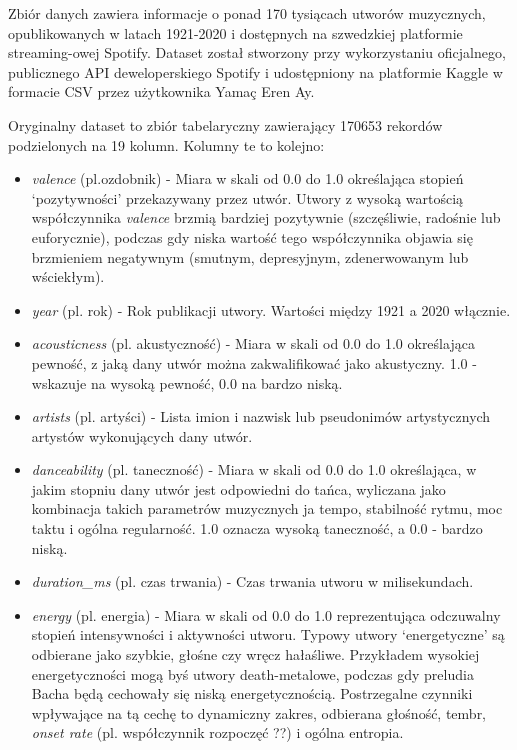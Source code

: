 \documentclass[a4paper,11pt]{article}
\begin{document}
    Zbiór danych zawiera informacje o ponad 170 tysiącach utworów muzycznych, opublikowanych w latach 1921-2020 i dostępnych na szwedzkiej platformie streaming-owej Spotify. Dataset został stworzony przy wykorzystaniu oficjalnego, publicznego API deweloperskiego Spotify i udostępniony na platformie Kaggle w formacie CSV przez użytkownika Yamaç Eren Ay\cite{SpotifyKaggleDataset2020}.

    \bigskip

    Oryginalny dataset to zbiór tabelaryczny zawierający 170653 rekordów podzielonych na 19 kolumn. Kolumny te to kolejno:
    \begin{itemize}
        \item \textit{valence} (pl.ozdobnik) - Miara w skali od 0.0 do 1.0 określająca stopień `pozytywności' przekazywany przez utwór. Utwory z wysoką wartością współczynnika \textit{valence} brzmią bardziej pozytywnie (szczęśliwie, radośnie lub euforycznie), podczas gdy niska wartość tego współczynnika objawia się brzmieniem negatywnym (smutnym, depresyjnym, zdenerwowanym lub wściekłym).
        \item \textit{year} (pl. rok) - Rok publikacji utwory. Wartości między 1921 a 2020 włącznie.
        \item \textit{acousticness} (pl. akustyczność) - Miara w skali od 0.0 do 1.0 określająca pewność, z jaką dany utwór można zakwalifikować jako akustyczny. 1.0 - wskazuje na wysoką pewność, 0.0 na bardzo niską.
        \item \textit{artists} (pl. artyści) - Lista imion i nazwisk lub pseudonimów artystycznych artystów wykonujących dany utwór.
        \item \textit{danceability} (pl. taneczność) - Miara w skali od 0.0 do 1.0 określająca, w jakim stopniu dany utwór jest odpowiedni do tańca, wyliczana jako kombinacja takich parametrów muzycznych ja tempo, stabilność rytmu, moc taktu i ogólna regularność. 1.0 oznacza wysoką taneczność, a 0.0 - bardzo niską.
        \item \textit{duration\_ms} (pl. czas trwania) - Czas trwania utworu w milisekundach.
        \item \textit{energy} (pl. energia) - Miara w skali od 0.0 do 1.0 reprezentująca odczuwalny stopień intensywności i aktywności utworu. Typowy utwory `energetyczne' są odbierane jako szybkie, głośne czy wręcz hałaśliwe. Przykładem wysokiej energetyczności mogą byś utwory death-metalowe, podczas gdy preludia Bacha będą cechowały się niską energetycznością. Postrzegalne czynniki wpływające na tą cechę to dynamiczny zakres, odbierana głośność, tembr, \textit{onset rate} (pl. współczynnik rozpoczęć ??) i ogólna entropia.

\end{itemize}
\end{document}
